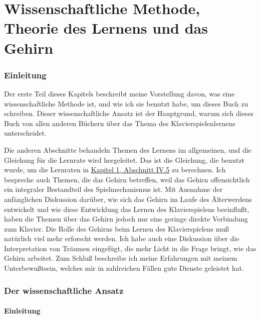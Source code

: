 
\chapter{Wissenschaftliche Methode, Theorie des Lernens und das Gehirn}
\label{c3_1}

\subsection{Einleitung}

Der erste Teil dieses Kapitels beschreibt meine Vorstellung davon, was eine wissenschaftliche Methode ist, und wie ich sie benutzt habe, um dieses Buch zu schreiben.
Dieser wissenschaftliche Ansatz ist der Hauptgrund, warum sich dieses Buch von allen anderen Büchern über das Thema des Klavierspielenlernens unterscheidet.

Die anderen Abschnitte behandeln Themen des Lernens im allgemeinen, und die Gleichung für die Lernrate wird hergeleitet.
Das ist die Gleichung, die benutzt wurde, um die Lernraten in \hyperref[c1iv5]{Kapitel 1, Abschnitt IV.5} zu berechnen.
Ich bespreche auch Themen, die das Gehirn betreffen, weil das Gehirn offensichtlich ein integraler Bestandteil des Spielmechanismus ist.
Mit Ausnahme der anfänglichen Diskussion darüber, wie sich das Gehirn im Laufe des Älterwerdens entwickelt und wie diese Entwicklung das Lernen des Klavierspielens beeinflußt, haben die Themen über das Gehirn jedoch nur eine geringe direkte Verbindung zum Klavier.
Die Rolle des Gehirns beim Lernen des Klavierspielens muß natürlich viel mehr erforscht werden.
Ich habe auch eine Diskussion über die Interpretation von Träumen eingefügt, die mehr Licht in die Frage bringt, wie das Gehirn arbeitet.
Zum Schluß beschreibe ich meine Erfahrungen mit meinem Unterbewußtsein, welches mir in zahlreichen Fällen gute Dienste geleistet hat.
 

\subsection{Der wissenschaftliche Ansatz}
\label{c3_2}

\subsubsection{Einleitung}
\label{c3_2a}


